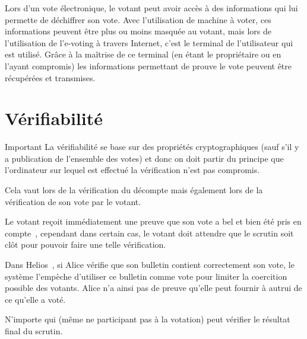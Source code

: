 \documentclass[../report]{subfiles}
\begin{document}
Lors d'un vote électronique, le votant peut avoir accès à des informations qui lui permette de déchiffrer son vote.
Avec l'utilisation de machine à voter, ces informations peuvent être plus ou moins masquée au votant, mais lors
de l'utilisation de l'e-voting à travers Internet, c'est le terminal de l'utilisateur qui est utilisé.
Grâce à la maîtrise de ce terminal (en étant le propriétaire ou en l'ayant compromis) les informations permettant
de prouve le vote peuvent être récupérées et transmises.

\section{Vérifiabilité}

\begin{important}{Important}
  La vérifiabilité se base sur des propriétés cryptographiques (sauf s'il y a publication 
  de l'ensemble des votes) et donc on doit partir du principe que l'ordinateur sur lequel 
  est effectué la vérification n'est pas compromis.

  Cela vaut lors de la vérification du décompte mais également 
  lors de la vérification de son vote par le votant.
\end{important}

Le votant reçoit immédiatement une preuve que son vote a bel et bien été pris en 
compte~\cite{adida_ballot_2006}, cependant dans certain cas, le votant doit attendre que 
le scrutin soit clôt pour pouvoir faire une telle vérification.

Dans Helios~\cite{noauthor_helios_nodate}, si Alice vérifie que son bulletin contient
correctement son vote, le système l'empèche d'utiliser ce bulletin comme vote pour limiter
la coercition possible des votants.
Alice n'a ainsi pas de preuve qu'elle peut fournir à autrui de ce qu'elle a voté.

N'importe qui (même ne participant pas à la votation) peut vérifier le résultat final du scrutin.
\end{document}
